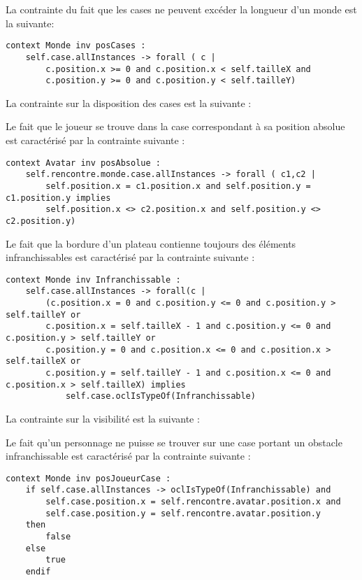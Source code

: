 La contrainte du fait que les cases ne peuvent excéder la longueur d'un monde est la suivante:

\begin{lstlisting}[caption=Contrainte sur la position des cases,captionpos=b,label={lst:casePos},language=OCL]
context Monde inv posCases :
	self.case.allInstances -> forall ( c |
		c.position.x >= 0 and c.position.x < self.tailleX and
		c.position.y >= 0 and c.position.y < self.tailleY)
\end{lstlisting}

La contrainte  sur la disposition des cases est la suivante :


Le fait que le joueur se trouve dans la case correspondant à sa position absolue est caractérisé par la contrainte suivante :

\begin{lstlisting}[caption=Contrainte sur la position du joueur,captionpos=b,label={lst:posJoueur},language=OCL]
context Avatar inv posAbsolue :
	self.rencontre.monde.case.allInstances -> forall ( c1,c2 |
		self.position.x = c1.position.x and self.position.y = c1.position.y implies
		self.position.x <> c2.position.x and self.position.y <> c2.position.y)
\end{lstlisting}

Le fait que la bordure d'un plateau contienne toujours des éléments infranchissables est caractérisé par la contrainte suivante :

\begin{lstlisting}[caption=Contrainte sur la bordure du plateau,captionpos=b,label={lst:bordurePlat},language=OCL]
context Monde inv Infranchissable :
	self.case.allInstances -> forall(c |
		(c.position.x = 0 and c.position.y <= 0 and c.position.y > self.tailleY or
		c.position.x = self.tailleX - 1 and c.position.y <= 0 and c.position.y > self.tailleY or
		c.position.y = 0 and c.position.x <= 0 and c.position.x > self.tailleX or
		c.position.y = self.tailleY - 1 and c.position.x <= 0 and c.position.x > self.tailleX) implies
			self.case.oclIsTypeOf(Infranchissable)
\end{lstlisting}

La contrainte sur la visibilité est la suivante :

Le fait qu'un personnage ne puisse se trouver sur une case portant un obstacle infranchissable est caractérisé par la contrainte suivante :

\begin{lstlisting}[caption=Contrainte sur la position du joueur sur case infranchissable,captionpos=b,label={lst:caseInfranchissable},language=OCL]
context Monde inv posJoueurCase :
	if self.case.allInstances -> oclIsTypeOf(Infranchissable) and
		self.case.position.x = self.rencontre.avatar.position.x and
		self.case.position.y = self.rencontre.avatar.position.y
	then
		false
	else
		true
	endif
\end{lstlisting}

